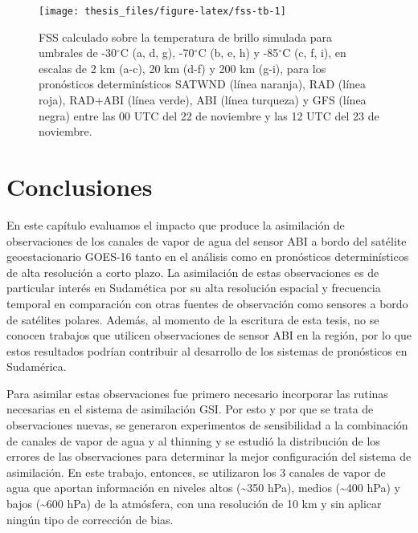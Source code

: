 \documentclass[12pt,oneside,a4paper]{reedthesis}
\begin{document}
\begin{figure}
\texttt{[image: thesis\_files/figure-latex/fss-tb-1]} \caption{FSS calculado sobre la temperatura de brillo simulada para umbrales de -30\(^\circ\)C (a, d, g), -70\(^\circ\)C (b, e, h) y -85\(^\circ\)C (c, f, i), en escalas de 2 km (a-c), 20 km (d-f) y 200 km (g-i), para los pronósticos determinísticos SATWND (línea naranja), RAD (línea roja), RAD+ABI (línea verde), ABI (línea turqueza) y GFS (línea negra) entre las 00 UTC del 22 de noviembre y las 12 UTC del 23 de noviembre.}\label{fig:fss-tb}
\end{figure}
\hypertarget{conclusiones-2}{%
\section{Conclusiones}\label{conclusiones-2}}

En este capítulo evaluamos el impacto que produce la asimilación de observaciones de los canales de vapor de agua del sensor ABI a bordo del satélite geoestacionario GOES-16 tanto en el análisis como en pronósticos determinísticos de alta resolución a corto plazo. La asimilación de estas observaciones es de particular interés en Sudamética por su alta resolución espacial y frecuencia temporal en comparación con otras fuentes de observación como sensores a bordo de satélites polares. Además, al momento de la escritura de esta tesis, no se conocen trabajos que utilicen observaciones de sensor ABI en la región, por lo que estos resultados podrían contribuir al desarrollo de los sistemas de pronósticos en Sudamérica.

Para asimilar estas observaciones fue primero necesario incorporar las rutinas necesarias en el sistema de asimilación GSI. Por esto y por que se trata de observaciones nuevas, se generaron experimentos de sensibilidad a la combinación de canales de vapor de agua y al thinning y se estudió la distribución de los errores de las observaciones para determinar la mejor configuración del sistema de asimilación. En este trabajo, entonces, se utilizaron los 3 canales de vapor de agua que aportan información en niveles altos (\textasciitilde350 hPa), medios (\textasciitilde400 hPa) y bajos (\textasciitilde600 hPa) de la atmósfera, con una resolución de 10 km y sin aplicar ningún tipo de corrección de bias.
\end{document}
